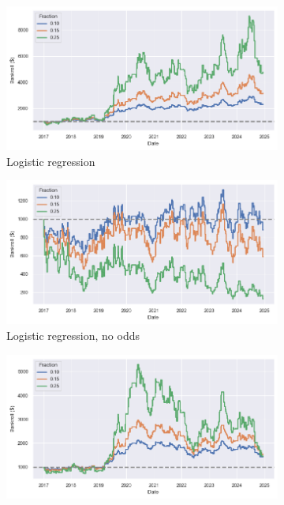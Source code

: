 \documentclass[12pt,twoside]{report}
\begin{document}
\begin{figure}[!htb]
\centering
\captionsetup{justification=centering}
\begin{subfigure}{.5\linewidth}
  \centering
  \includegraphics[width=\linewidth]{figures/bankroll_lr_simultaneous.png}
  \caption{Logistic regression}
\end{subfigure}%
\begin{subfigure}{.5\linewidth}
  \centering
  \includegraphics[width=\linewidth]{figures/bankroll_lr_no_odds_simultaneous.png}
  \caption{Logistic regression, no odds}
\end{subfigure}
\begin{subfigure}{.5\linewidth}
  \centering
  \includegraphics[width=\linewidth]{figures/bankroll_va_lr_simultaneous.png}

\end{subfigure}
\end{figure}
\end{document}
